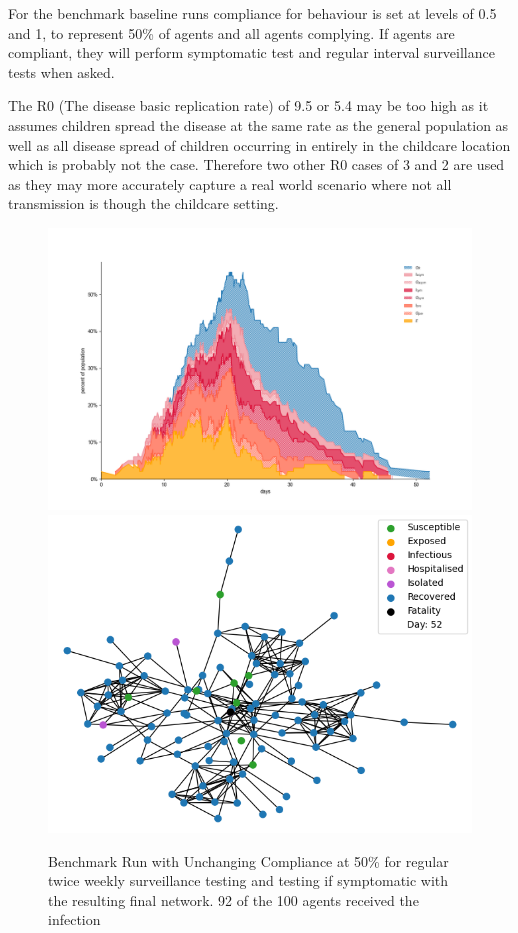 \documentclass{article}
\begin{document}
For the benchmark baseline runs compliance for behaviour is set at levels of 0.5 and 1, to represent 50\% of agents and all agents complying. If agents are compliant, they will perform symptomatic test and regular interval surveillance tests when asked.\newline

The R0 (The disease basic replication rate) of 9.5 or 5.4 may be too high as it assumes children spread the disease at the same rate as the general population as well as all disease spread of children occurring in entirely in the childcare location which is probably not the case. Therefore two other R0 cases of 3 and 2 are used as they may more accurately capture a real world scenario where not all transmission is though the childcare setting.\newline

\begin{figure}
\centering
\includegraphics[width=\textwidth]{Figure3}
\includegraphics[width=\textwidth]{Figure3Net}
\caption{Benchmark Run with Unchanging Compliance at 50\% for regular twice weekly surveillance testing and testing if symptomatic with the resulting final network. 92 of the 100 agents received the infection}
\end{figure}
\end{document}
